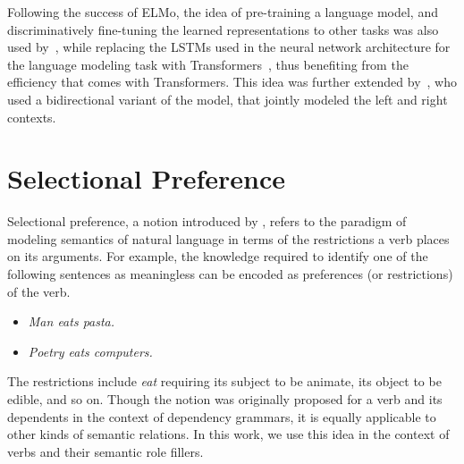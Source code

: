 Following the success of ELMo, the idea of pre-training a language model, and discriminatively fine-tuning the
learned representations to other tasks was also used by~\cite{radford2018improving}, while replacing the LSTMs used
in the neural network architecture for the language modeling task with Transformers~\citep{vaswani2017attention},
thus benefiting from the efficiency that comes with Transformers. This idea was further extended by~\cite{devlin2018bert},
who used a bidirectional variant of the model, that jointly modeled the left and right
contexts.


\section{Selectional Preference}
Selectional preference, a notion introduced by \cite{wilks1973preference}, 
refers to the paradigm of modeling semantics of
natural language in terms of the restrictions a verb places on its arguments. 
For example, the knowledge required to identify
one of the following sentences as meaningless can be encoded as preferences (or 
restrictions) of the verb.
\begin{itemize}
	\item[] \textit{Man eats pasta.}
	\item[] \textit{Poetry eats computers.}
\end{itemize}
The restrictions include \textit{eat} requiring its subject to be animate, its 
object to be edible, and so on. Though the
notion was originally proposed for a verb and its dependents in the context of 
dependency grammars, it is equally applicable to
other kinds of semantic relations. In this work,
we use this idea in the context of verbs and their semantic role fillers.

